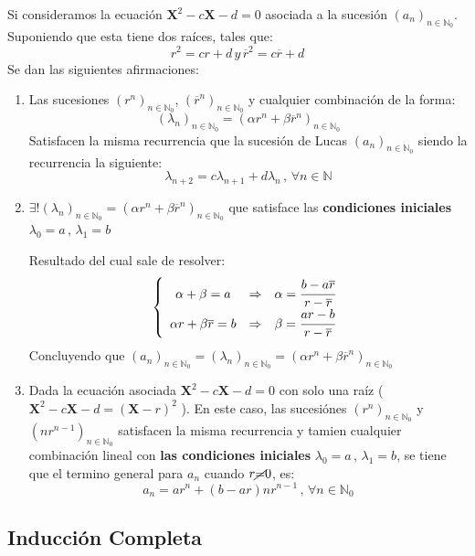 \documentclass[10pt]{article}
\begin{document}
Si consideramos la ecuación $\mathbf{X}^2 - c \mathbf{X} - d=0$ asociada a la sucesión $(a_n)_{n \in \mathbb{N}_0}$. Suponiendo que esta tiene dos raíces, tales que:
$$r^2 = c r + d \, y \, \overline{r}^2 = c \overline{r} + d$$
Se dan las siguientes afirmaciones:
\begin{enumerate}
 \item Las sucesiones $(r^n)_{n \in \mathbb{N}_0}$, $(\overline{r}^n)_{n \in \mathbb{N}_0}$ y cualquier combinación de la forma:
 $$(\lambda_n)_{n \in \mathbb{N}_0} = (\alpha r^n + \beta \overline{r}^n)_{n \in \mathbb{N}_0}$$
 Satisfacen la misma recurrencia que la sucesión de Lucas $(a_n)_{n \in \mathbb{N}_0}$  siendo la recurrencia la siguiente:
 $$\lambda_{n+2} = c \lambda_{n+1} + d \lambda_n \, , \, \forall n \in \mathbb{N}$$
 \item $\exists ! (\lambda_n)_{n \in \mathbb{N}_0} = (\alpha r^n + \beta \overline{r}^n)_{n \in \mathbb{N}_0}$ que satisface las \textbf{condiciones iniciales} $\lambda_0 = a \, , \, \lambda_1 = b$
 
 Resultado del cual sale de resolver:
 \begin{displaymath}
 	\left\{ \begin{array}{ccc}
 		\alpha + \beta = a & \Rightarrow & \alpha = \cfrac{b - a \overline{r}}{r - \overline{r}} \\
 		\alpha r + \beta \overline{r} = b & \Rightarrow & \beta = \cfrac{a r - b}{r - \overline{r}}
 	\end{array}\right.
 \end{displaymath}
 Concluyendo que $(a_n)_{n \in \mathbb{N}_0} = (\lambda_n)_{n \in \mathbb{N}_0} = (\alpha r^n + \beta \overline{r}^n)_{n \in \mathbb{N}_0}$
 \item Dada la ecuación asociada $\mathbf{X}^2 - c \mathbf{X} - d=0$ con solo una raíz ($\mathbf{X}^2 - c \mathbf{X} - d= (\mathbf{X} - r)^2$ ). En este caso, las sucesiónes $(r^n)_{n \in \mathbb{N}_0}$ y $( n r^{n-1})_{n \in \mathbb{N}_0}$ satisfacen la misma recurrencia y tamien cualquier combinación lineal con \textbf{las condiciones iniciales}  $\lambda_0 = a \, , \, \lambda_1 = b$, se tiene que el termino general para $a_n$ cuando $r \cancel{=} 0$, es:
 $$a_n = a r^n + (b -a r)n r^{n-1} \, , \, \forall n \in \mathbb{N}_0 $$
\end{enumerate}
 
 \begin{center}
  \subsection{Inducción Completa}
 \end{center}
\end{document}
